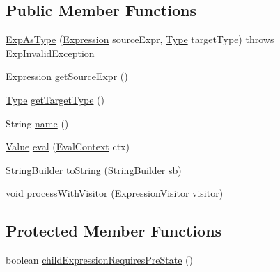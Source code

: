 \subsection*{Public Member Functions}
\begin{DoxyCompactItemize}
\item 
\hyperlink{classorg_1_1tzi_1_1use_1_1uml_1_1ocl_1_1expr_1_1_exp_as_type_ae01940b0f6ed733d764b46b75be33837}{Exp\-As\-Type} (\hyperlink{classorg_1_1tzi_1_1use_1_1uml_1_1ocl_1_1expr_1_1_expression}{Expression} source\-Expr, \hyperlink{interfaceorg_1_1tzi_1_1use_1_1uml_1_1ocl_1_1type_1_1_type}{Type} target\-Type)  throws Exp\-Invalid\-Exception     
\item 
\hyperlink{classorg_1_1tzi_1_1use_1_1uml_1_1ocl_1_1expr_1_1_expression}{Expression} \hyperlink{classorg_1_1tzi_1_1use_1_1uml_1_1ocl_1_1expr_1_1_exp_as_type_a7322b16e784cafcf5079f93a4d6ff4f8}{get\-Source\-Expr} ()
\item 
\hyperlink{interfaceorg_1_1tzi_1_1use_1_1uml_1_1ocl_1_1type_1_1_type}{Type} \hyperlink{classorg_1_1tzi_1_1use_1_1uml_1_1ocl_1_1expr_1_1_exp_as_type_ada51dc85700ebbe2627795c8a5e2118a}{get\-Target\-Type} ()
\item 
String \hyperlink{classorg_1_1tzi_1_1use_1_1uml_1_1ocl_1_1expr_1_1_exp_as_type_abeb576e0287a2c1c98f2f3886019a5e6}{name} ()
\item 
\hyperlink{classorg_1_1tzi_1_1use_1_1uml_1_1ocl_1_1value_1_1_value}{Value} \hyperlink{classorg_1_1tzi_1_1use_1_1uml_1_1ocl_1_1expr_1_1_exp_as_type_a8137261646b47bd12b9cb57bcd093a5b}{eval} (\hyperlink{classorg_1_1tzi_1_1use_1_1uml_1_1ocl_1_1expr_1_1_eval_context}{Eval\-Context} ctx)
\item 
String\-Builder \hyperlink{classorg_1_1tzi_1_1use_1_1uml_1_1ocl_1_1expr_1_1_exp_as_type_a7f3c905f73343e03e2b85e88d3b75e31}{to\-String} (String\-Builder sb)
\item 
void \hyperlink{classorg_1_1tzi_1_1use_1_1uml_1_1ocl_1_1expr_1_1_exp_as_type_ad6faae5b424e65e39c6037c1209866e5}{process\-With\-Visitor} (\hyperlink{interfaceorg_1_1tzi_1_1use_1_1uml_1_1ocl_1_1expr_1_1_expression_visitor}{Expression\-Visitor} visitor)
\end{DoxyCompactItemize}
\subsection*{Protected Member Functions}
\begin{DoxyCompactItemize}
\item 
boolean \hyperlink{classorg_1_1tzi_1_1use_1_1uml_1_1ocl_1_1expr_1_1_exp_as_type_a08a678ee90381e80d03b458aaa2be46d}{child\-Expression\-Requires\-Pre\-State} ()
\end{DoxyCompactItemize}


